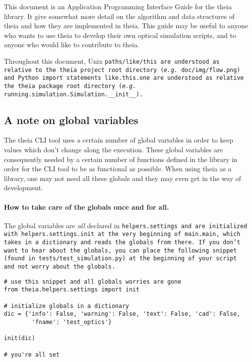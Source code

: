 \documentclass{article}
\begin{document}
This document is an Application Programming Interface Guide for the theia library. It give somewhat more detail on the algorithm and data structures of theia and how they are implemented in theia. This guide may be useful to anyone who wants to use theia to develop their own optical simulation scripts, and to anyone who would like to contribute to theia.

Throughout this document, Unix \tt{paths/like/this} are understood as relative to the theia project root directory (\textit{e.g.} \tt{doc/img/flow.png}) and Python import statements \tt{like.this.one} are understood as relative the theia package root directory (\textit{e.g.} \tt{running.simulation.Simulation.\_\_init\_\_}).


\subsection{A note on global variables}
The theia CLI tool uses a certain number of global variables in order to keep values which don't change along the execution. These global variables are consequently needed by a certain number of functions defined in the library in order for the CLI tool to be as functional as possible. When using theia as a library, one may not need all these globals and they may even get in the way of development.

\paragraph{How to take care of the globals once and for all.}The global variables are \textit{all} declared in \tt{helpers.settings} and are initialized with \tt{helpers.settings.init} at the very beginning of \tt{main.main}, which takes in a dictionary and reads the globals from there. If you don't want to hear about the globals, you can place the following snippet (found in \tt{tests/test\_simulation.py}) at the beginning of your script and not worry about the globals.

\begin{lstlisting}
# use this snippet and all globals worries are gone
from theia.helpers.settings import init

# initialize globals in a dictionary
dic = {'info': False, 'warning': False, 'text': False, 'cad': False,
		'fname': 'test_optics'}

init(dic)

# you're all set 
\end{lstlisting}
\end{document}
